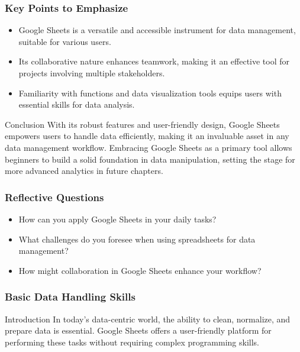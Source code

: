 \documentclass[aspectratio=169]{beamer}
\begin{document}
\begin{frame}[fragile]
    \frametitle{Key Points to Emphasize}
    \begin{itemize}
        \item Google Sheets is a versatile and accessible instrument for data management, suitable for various users.
        \item Its collaborative nature enhances teamwork, making it an effective tool for projects involving multiple stakeholders.
        \item Familiarity with functions and data visualization tools equips users with essential skills for data analysis.
    \end{itemize}

    \begin{block}{Conclusion}
        With its robust features and user-friendly design, Google Sheets empowers users to handle data efficiently, making it an invaluable asset in any data management workflow.
        Embracing Google Sheets as a primary tool allows beginners to build a solid foundation in data manipulation, setting the stage for more advanced analytics in future chapters.
    \end{block}
\end{frame}

\begin{frame}[fragile]
    \frametitle{Reflective Questions}
    \begin{itemize}
        \item How can you apply Google Sheets in your daily tasks?
        \item What challenges do you foresee when using spreadsheets for data management?
        \item How might collaboration in Google Sheets enhance your workflow?
    \end{itemize}
\end{frame}

\begin{frame}[fragile]
    \frametitle{Basic Data Handling Skills}
    \begin{block}{Introduction}
        In today's data-centric world, the ability to clean, normalize, and prepare data is essential. Google Sheets offers a user-friendly platform for performing these tasks without requiring complex programming skills.
    \end{block}
\end{frame}
\end{document}
